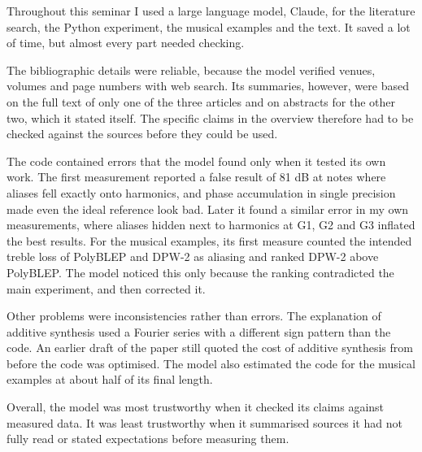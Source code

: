 Throughout this seminar I used a large language model, Claude, for the
literature search, the Python experiment, the musical examples and the
text. It saved a lot of time, but almost every part needed checking.

The bibliographic details were reliable, because the model verified
venues, volumes and page numbers with web search. Its summaries, however,
were based on the full text of only one of the three articles and on
abstracts for the other two, which it stated itself. The specific claims
in the overview therefore had to be checked against the sources before
they could be used.

The code contained errors that the model found only when it tested its
own work. The first measurement reported a false result of 81 dB at notes
where aliases fell exactly onto harmonics, and phase accumulation in
single precision made even the ideal reference look bad. Later it found a
similar error in my own measurements, where aliases hidden next to
harmonics at G1, G2 and G3 inflated the best results. For the musical
examples, its first measure counted the intended treble loss of PolyBLEP
and DPW-2 as aliasing and ranked DPW-2 above PolyBLEP. The model noticed
this only because the ranking contradicted the main experiment, and then
corrected it.

Other problems were inconsistencies rather than errors. The explanation of
additive synthesis used a Fourier series with a different sign pattern
than the code. An earlier draft of the paper still quoted the cost of
additive synthesis from before the code was optimised. The model also estimated the code for the musical
examples at about half of its final length.

Overall, the model was most trustworthy when it checked its claims
against measured data. It was least trustworthy when it summarised
sources it had not fully read or stated expectations before measuring
them.
